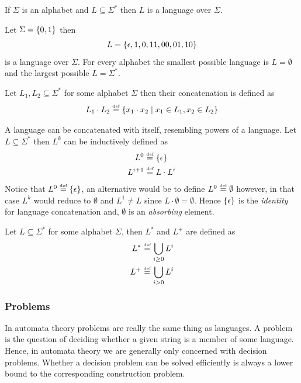 \begin{definition}[Language] \label{def:language}
    If $\Sigma$ is an alphabet and $L\subseteq \Sigma^*$ then $L$ is a language over $\Sigma$. 
\end{definition}

\begin{example}
    Let $\Sigma = \left\{ 0,1 \right\}$ then $$L = \left\{ \epsilon, 1, 0, 11, 00, 01, 10 \right\}$$ is a language over $\Sigma$. For every alphabet the smallest possible language is $L = \emptyset$ and the largest possible $L = \Sigma^*$.
\end{example}

\begin{definition} \label{def:language-concatenation}
Let $L_1, L_2 \subseteq \Sigma^*$ for some alphabet $\Sigma$ then their concatenation is defined as $$L_1 \cdot L_2 \stackrel {\mbox{\tiny def}}{=} \left\{ x_1 \cdot x_2 \mid  x_1 \in L_1, x_2\in L_2 \right\}$$ 
\end{definition}

A language can be concatenated with itself, resembling powers of a language. Let $L \subseteq \Sigma^*$ then $L^k$ can be inductively defined as 
\begin{align*}
    L^0 &\stackrel {\mbox{\tiny def}}{=} \left\{ \epsilon \right\} \\
    L^{i+1} &\stackrel {\mbox{\tiny def}}{=} L \cdot L^i
\end{align*}
Notice that $L^0 \stackrel {\mbox{\tiny def}}{=} \left\{ \epsilon \right\}$, an alternative would be to define $L^0 \stackrel {\mbox{\tiny def}}{=} \emptyset$ however, in that case $L^k$ would reduce to $\emptyset$ and $L^1 \neq L$ since $L\cdot \emptyset = \emptyset$. Hence $\left\{ \epsilon \right\}$ is the \textit{identity} for language concatenation and, $\emptyset$ is an \textit{absorbing} element.

\begin{definition} \label{def:kleene-star}
    Let $L\subseteq \Sigma^*$ for some alphabet $\Sigma$, then $L^*$ and $L^+$ are defined as 
    \begin{align*}
        L^* &\stackrel {\mbox{\tiny def}}{=} \bigcup_{i \geq0} L^i \\
        L^+ &\stackrel {\mbox{\tiny def}}{=} \bigcup_{i > 0} L ^i
    \end{align*}
\end{definition}

\subsubsection{Problems}
In automata theory problems are really the same thing as languages. A problem is the question of deciding whether a given string is a member of some language. Hence, in automata theory we are generally only concerned with decision problems. Whether a decision problem can be solved efficiently is always a lower bound to the corresponding construction problem.